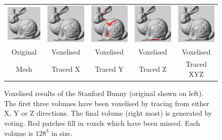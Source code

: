 \begin{figure}
  \centering
  \begin{tabular}{ccccc}
    \includegraphics[width=0.17\linewidth]{imggen/vox_xyz/bunny_original.png} &
    \includegraphics[width=0.17\linewidth]{imggen/vox_xyz/bunny_voxX.png} &
    \includegraphics[width=0.17\linewidth]{imggen/vox_xyz/bunny_voxY.png} &
    \includegraphics[width=0.17\linewidth]{imggen/vox_xyz/bunny_voxZ.png} &
    \includegraphics[width=0.17\linewidth]{imggen/vox_xyz/bunny_voxXYZ.png} \\
    Original & Voxelised & Voxelised & Voxelised & Voxelised \\
    Mesh     & Traced X  & Traced Y  & Traced Z  & Traced XYZ \\
  \end{tabular}
  \caption[Voxelisation error due to limiting ray tracing
  directions]{Voxelised results of the Stanford Bunny (original shown
    on left). The first three volumes have been voxelised by tracing
    from either X, Y or Z directions. The final volume (right most) is
    generated by voting. Red patches fill in voxels which have been
    missed. Each volume is $128^3$ in size.}
  \label{fig:background:voltracing}
\end{figure}


